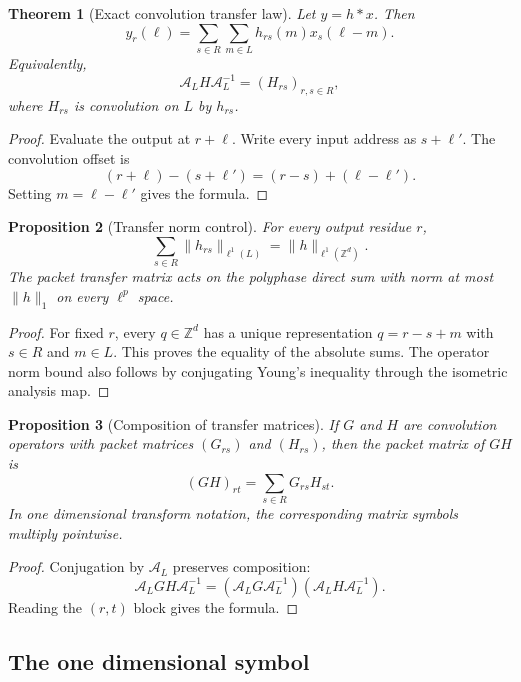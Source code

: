 \documentclass[11pt,a4paper]{article}
\newtheorem{theorem}{Theorem}[section]
\newtheorem{proposition}[theorem]{Proposition}
\theoremstyle{definition}
\theoremstyle{remark}
\newcommand{\ZZ}{\mathbb Z}
\newcommand{\Acal}{\mathcal A}
\begin{document}
\begin{theorem}[Exact convolution transfer law]\label{thm:convolution_transfer}
Let \(y=h*x\). Then
\[
y_r(\ell)
=
\sum_{s\in R}\sum_{m\in L}h_{rs}(m)x_s(\ell-m).
\]
Equivalently,
\[
\Acal_LH\Acal_L^{-1}
=
(H_{rs})_{r,s\in R},
\]
where \(H_{rs}\) is convolution on \(L\) by \(h_{rs}\).
\end{theorem}

\begin{proof}
Evaluate the output at \(r+\ell\). Write every input address as \(s+\ell'\). The convolution offset is
\[
(r+\ell)-(s+\ell')
=(r-s)+(\ell-\ell').
\]
Setting \(m=\ell-\ell'\) gives the formula.
\end{proof}

\begin{proposition}[Transfer norm control]\label{prop:transfer_norm_control}
For every output residue \(r\),
\[
\sum_{s\in R}\|h_{rs}\|_{\ell^1(L)}
=
\|h\|_{\ell^1(\ZZ^d)}.
\]
The packet transfer matrix acts on the polyphase direct sum with norm at most \(\|h\|_1\) on every \(\ell^p\) space.
\end{proposition}

\begin{proof}
For fixed \(r\), every \(q\in\ZZ^d\) has a unique representation \(q=r-s+m\) with \(s\in R\) and \(m\in L\). This proves the equality of the absolute sums. The operator norm bound also follows by conjugating Young's inequality through the isometric analysis map.
\end{proof}

\begin{proposition}[Composition of transfer matrices]\label{prop:transfer_composition}
If \(G\) and \(H\) are convolution operators with packet matrices \((G_{rs})\) and \((H_{rs})\), then the packet matrix of \(GH\) is
\[
(GH)_{rt}
=
\sum_{s\in R}G_{rs}H_{st}.
\]
In one dimensional transform notation, the corresponding matrix symbols multiply pointwise.
\end{proposition}

\begin{proof}
Conjugation by \(\Acal_L\) preserves composition:
\[
\Acal_LGH\Acal_L^{-1}
=
(\Acal_LG\Acal_L^{-1})(\Acal_LH\Acal_L^{-1}).
\]
Reading the \((r,t)\) block gives the formula.
\end{proof}

\subsection{The one dimensional symbol}
\end{document}
